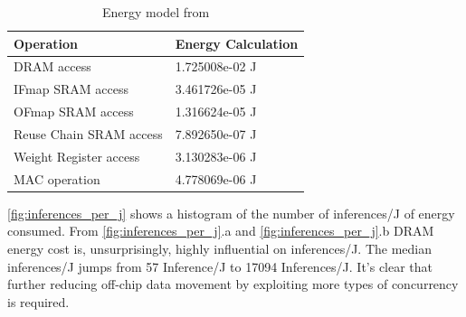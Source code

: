 \begin{table}[]
    \center
    \begin{tabular}{|l|l|}
    \toprule
    Operation & Energy Calculation    \\ 
    \midrule
    DRAM access             &  1.725008e-02 J \\
    IFmap SRAM access      &  3.461726e-05 J\\
    OFmap SRAM access        &  1.316624e-05 J\\
    Reuse Chain SRAM access &  7.892650e-07 J\\
    Weight Register access     &  3.130283e-06 J\\
    MAC operation              &  4.778069e-06 J\\
    \bottomrule
\end{tabular}
\caption{Energy model from \cite{area_model}}
\label{tab:median_energy_per_network}
\end{table}

\autoref{fig:inferences_per_j} shows a histogram of the number of inferences/J of
energy consumed. From \autoref{fig:inferences_per_j}.a and
\autoref{fig:inferences_per_j}.b DRAM energy cost is, unsurprisingly, highly influential on
inferences/J. The median inferences/J jumps from 57 Inference/J to 17094
Inferences/J. It's clear that further reducing off-chip data movement by
exploiting more types of concurrency is required. 

